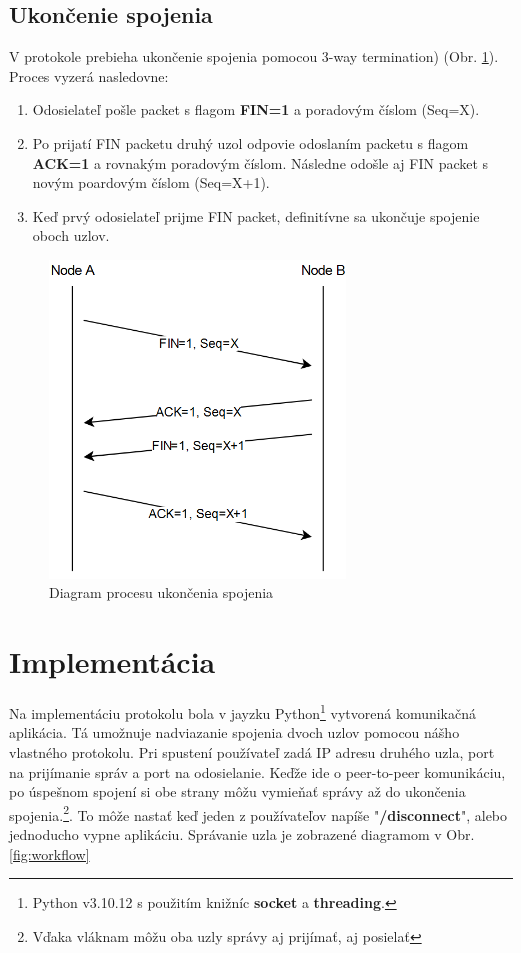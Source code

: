 \documentclass[a4paper,12pt]{article}
\begin{document}
	\subsection{Ukončenie spojenia}
		V protokole prebieha ukončenie spojenia pomocou 3-way termination) (Obr. \ref{fig:disconnect_diagram}). Proces vyzerá nasledovne:
		\begin{enumerate}
			\item Odosielateľ pošle packet s flagom \textbf{FIN=1} a poradovým číslom (Seq=X).
			\item Po prijatí FIN packetu druhý uzol odpovie odoslaním packetu s flagom \textbf{ACK=1} a rovnakým poradovým číslom. Následne odošle aj FIN packet s novým poardovým číslom (Seq=X+1).
			\item Keď prvý odosielateľ prijme FIN packet, definitívne sa ukončuje spojenie oboch uzlov.

		\end{enumerate}
			
		\begin{figure}[h]
		    \centering
		    \includegraphics[width=0.70\textwidth]{disconnect_diagram.png}
		    \caption{Diagram procesu ukončenia spojenia}
		    \label{fig:disconnect_diagram}
		\end{figure}


\section{Implementácia}
    Na implementáciu protokolu bola v jayzku Python\footnote{Python v3.10.12 s použitím knižníc \textbf{socket} a \textbf{threading}.} vytvorená komunikačná aplikácia. Tá umožnuje nadviazanie spojenia dvoch uzlov pomocou nášho vlastného protokolu. Pri spustení používateľ zadá IP adresu druhého uzla, port na prijímanie správ a port na odosielanie. Keďže ide o peer-to-peer komunikáciu, po úspešnom spojení si obe strany môžu vymieňať správy až do ukončenia spojenia.\footnote{Vďaka vláknam môžu oba uzly správy aj prijímať, aj posielať}. To môže nastať keď jeden z používateľov napíše "\textbf{/disconnect}", alebo jednoducho vypne aplikáciu. Správanie uzla je zobrazené diagramom v Obr. \ref{fig:workflow}
\end{document}
